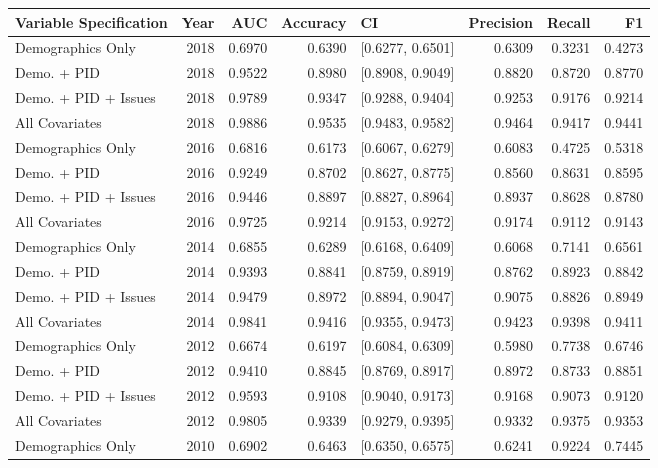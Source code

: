 \begin{table}[ht]
\centering
\begin{tabular}{lrrrlrrr}
  \toprule
Variable Specification & Year & AUC & Accuracy & CI & Precision & Recall & F1 \\ 
  \midrule
Demographics Only & 2018 & 0.6970 & 0.6390 & [0.6277, 0.6501] & 0.6309 & 0.3231 & 0.4273 \\ 
  Demo. + PID & 2018 & 0.9522 & 0.8980 & [0.8908, 0.9049] & 0.8820 & 0.8720 & 0.8770 \\ 
  Demo. + PID + Issues & 2018 & 0.9789 & 0.9347 & [0.9288, 0.9404] & 0.9253 & 0.9176 & 0.9214 \\ 
  All Covariates & 2018 & 0.9886 & 0.9535 & [0.9483, 0.9582] & 0.9464 & 0.9417 & 0.9441 \\ 
  Demographics Only & 2016 & 0.6816 & 0.6173 & [0.6067, 0.6279] & 0.6083 & 0.4725 & 0.5318 \\ 
  Demo. + PID & 2016 & 0.9249 & 0.8702 & [0.8627, 0.8775] & 0.8560 & 0.8631 & 0.8595 \\ 
  Demo. + PID + Issues & 2016 & 0.9446 & 0.8897 & [0.8827, 0.8964] & 0.8937 & 0.8628 & 0.8780 \\ 
  All Covariates & 2016 & 0.9725 & 0.9214 & [0.9153, 0.9272] & 0.9174 & 0.9112 & 0.9143 \\ 
  Demographics Only & 2014 & 0.6855 & 0.6289 & [0.6168, 0.6409] & 0.6068 & 0.7141 & 0.6561 \\ 
  Demo. + PID & 2014 & 0.9393 & 0.8841 & [0.8759, 0.8919] & 0.8762 & 0.8923 & 0.8842 \\ 
  Demo. + PID + Issues & 2014 & 0.9479 & 0.8972 & [0.8894, 0.9047] & 0.9075 & 0.8826 & 0.8949 \\ 
  All Covariates & 2014 & 0.9841 & 0.9416 & [0.9355, 0.9473] & 0.9423 & 0.9398 & 0.9411 \\ 
  Demographics Only & 2012 & 0.6674 & 0.6197 & [0.6084, 0.6309] & 0.5980 & 0.7738 & 0.6746 \\ 
  Demo. + PID & 2012 & 0.9410 & 0.8845 & [0.8769, 0.8917] & 0.8972 & 0.8733 & 0.8851 \\ 
  Demo. + PID + Issues & 2012 & 0.9593 & 0.9108 & [0.9040, 0.9173] & 0.9168 & 0.9073 & 0.9120 \\ 
  All Covariates & 2012 & 0.9805 & 0.9339 & [0.9279, 0.9395] & 0.9332 & 0.9375 & 0.9353 \\ 
  Demographics Only & 2010 & 0.6902 & 0.6463 & [0.6350, 0.6575] & 0.6241 & 0.9224 & 0.7445 \\ 

\end{tabular}
\end{table}

